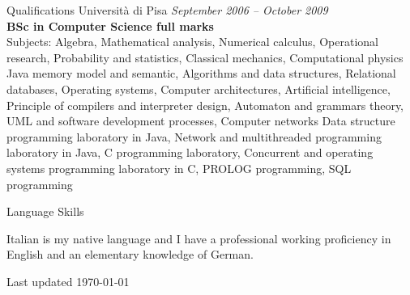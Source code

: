 \documentclass{resume}
\begin{document}
\begin{rSection}{Qualifications}
    Universit\`a di Pisa \hfill {\em September 2006 -- October 2009} \\
    {\bf BSc in Computer Science full marks}\\
    Subjects:
      Algebra, Mathematical analysis, Numerical calculus, Operational research,
	  Probability and statistics, Classical mechanics, Computational physics
      Java memory model and semantic, Algorithms and data structures, Relational databases,
	  Operating systems, Computer architectures, Artificial intelligence, Principle of compilers and interpreter design,
	  Automaton and grammars theory, UML and software development processes, Computer networks
      Data structure programming laboratory in Java, Network and multithreaded programming laboratory in Java,
	  C programming laboratory, Concurrent and operating systems programming laboratory in C,
	  PROLOG programming, SQL programming

  \end{rSection}

  \begin{rSection}{Language Skills}
    \item
      Italian is my native language and I have a professional working proficiency in English and an elementary knowledge of German.\\
  \end{rSection}

  \begin{rSection}{}
    Last updated \today 
  \end{rSection}
\end{document}
